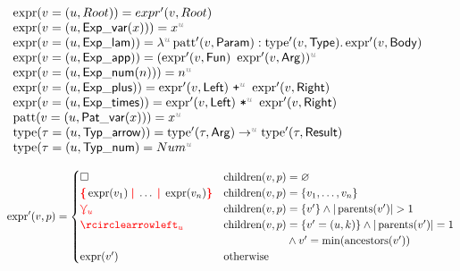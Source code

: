 






\begin{figure}
  \begin{displaymath}
    \begin{array}{l}
      \expr(v=(u, Root)) = expr'(v, Root) \\
      \expr(v=(u, \ExpVar(x))) = x^{\id{u}} \\
      \expr(v=(u, \ExpLam)) = \lambda^{\id{u}} \patt'(v, \LamParam) : \type'(v, \LamType) . \expr'(v, \LamBody) \\
      \expr(v=(u, \ExpApp)) = (\expr'(v, \AppFun)~\expr'(v, \AppArg))^{\id{u}} \\
      \expr(v=(u, \ExpNum(n))) = n^{\id{u}} \\
      \expr(v=(u, \ExpPlus)) = \expr'(v, \PlusLeft)~\texttt{+}^{\id{u}}~\expr'(v, \PlusRight) \\
      \expr(v=(u, \ExpTimes)) = \expr'(v, \TimesLeft)~\texttt{*}^{\id{u}}~\expr'(v, \TimesRight) \\
      \patt(v=(u, \PatVar(x))) = x^{\id{u}} \\
      \type(\tau=(u, \TypArrow)) = \type'(\tau, \ArrowArg) \rightarrow^{\id{u}} \type'(\tau, \ArrowResult) \\
      \type(\tau=(u, \TypNum) = Num^{\id{u}} \\
    \end{array}
  \end{displaymath}


  \begin{align*}
    \expr'(v,p) = \begin{cases}
      \hole & \children(v,p) = \varnothing \\
      \conflictHole{\expr(v_1),\ldots,\expr(v_n)} & \children(v,p) = \{v_1, \ldots, v_n\} \\
      \multiVertex{u} & \children(v,p) = \{v'\} \land |\parents(v')| > 1 \\
      \cycleVertex{u} & \children(v,p) = \{v'=(u,k)\} \land |\parents(v')| = 1 \\
          & \phantom{\children(v,p)} \land v' = \min(\ancestors(v')) \\
      \expr(v') & \text{otherwise} \\
    \end{cases}
  \end{align*}


\end{figure}
